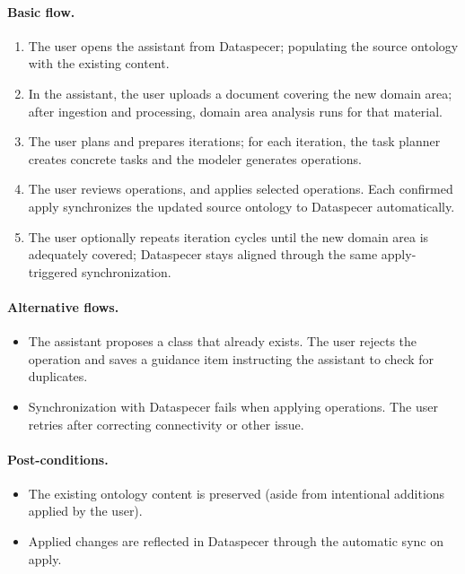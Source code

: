 \documentclass{article}
\begin{document}
\paragraph*{Basic flow.}
\begin{enumerate}
  \item The user opens the assistant from Dataspecer; populating the source ontology with the existing content.
  \item In the assistant, the user uploads a document covering the new domain area; after ingestion and processing, domain area analysis runs for that material.
  \item The user plans and prepares iterations; for each iteration, the task planner creates concrete tasks and the modeler generates operations.
  \item The user reviews operations, and applies selected operations. Each confirmed apply synchronizes the updated source ontology to Dataspecer automatically.
  \item The user optionally repeats iteration cycles until the new domain area is adequately covered; Dataspecer stays aligned through the same apply-triggered synchronization.
\end{enumerate}

\paragraph*{Alternative flows.}
\begin{itemize}
  \item[3a.] The assistant proposes a class that already exists. The user rejects the operation and saves a guidance item instructing the assistant to check for duplicates.
  \item[4a.] Synchronization with Dataspecer fails when applying operations. The user retries after correcting connectivity or other issue.
\end{itemize}

\paragraph*{Post-conditions.}
\begin{itemize}
  \item The existing ontology content is preserved (aside from intentional additions applied by the user).
  \item Applied changes are reflected in Dataspecer through the automatic sync on apply.
\end{itemize}
\end{document}
